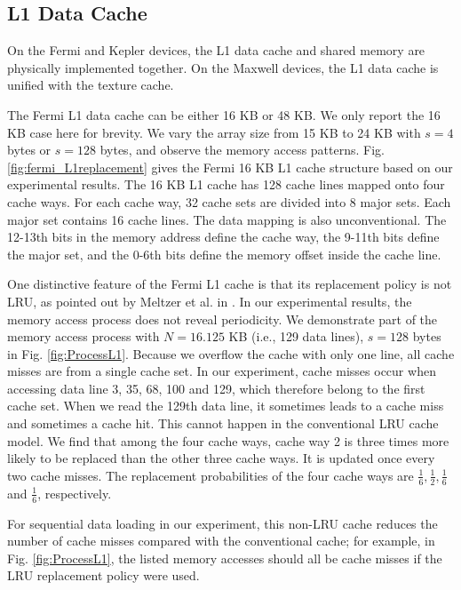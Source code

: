 \documentclass[10pt,journal,compsoc]{IEEEtran}
\theoremstyle{definition}
\begin{document}
\subsection{L1 Data Cache}
On the Fermi and Kepler devices, the L1 data cache and shared memory are physically implemented together. On the Maxwell devices, the L1 data cache is unified with the texture cache.

The Fermi L1 data cache can be either 16 KB or 48 KB. We only report the 16 KB case here for brevity. We vary the array size from 15 KB to 24 KB with $s=4$ bytes or $s=128$ bytes, and observe the memory access patterns. Fig. \ref{fig:fermi_L1replacement} gives the Fermi 16 KB L1 cache structure based on our experimental results. The 16 KB L1 cache has 128 cache lines mapped onto four cache ways. For each cache way, 32 cache sets are divided into 8 major sets. Each major set contains 16 cache lines. The data mapping is also unconventional. The 12-13th bits in the memory address define the cache way, the 9-11th bits define the major set, and the 0-6th bits define the memory offset inside the cache line.

One distinctive feature of the Fermi L1 cache is that its replacement policy is not LRU, as pointed out by Meltzer et al. in \cite{meltzer2013micro}. In our experimental results, the memory access process does not reveal periodicity. We demonstrate part of the memory access process with $N=16.125$ KB (i.e., 129 data lines), $s=128$ bytes in Fig. \ref{fig:ProcessL1}. Because we overflow the cache with only one line, all cache misses are from a single cache set. In our experiment, cache misses occur when accessing data line 3, 35, 68, 100 and 129, which therefore belong to the first cache set. When we read the 129th data line, it sometimes leads to a cache miss and sometimes a cache hit. This cannot happen in the conventional LRU cache model. We find that among the four cache ways, cache way 2 is three times more likely to be replaced than the other three cache ways. It is updated once every two cache misses. The replacement probabilities of the four cache ways are $\frac{1}{6}, \frac{1}{2}, \frac{1}{6}$ and $\frac{1}{6}$, respectively.

For sequential data loading in our experiment, this non-LRU cache reduces the number of cache misses compared with the conventional cache; for example, in Fig. \ref{fig:ProcessL1}, the listed memory accesses should all be cache misses if the LRU replacement policy were used.
\end{document}

